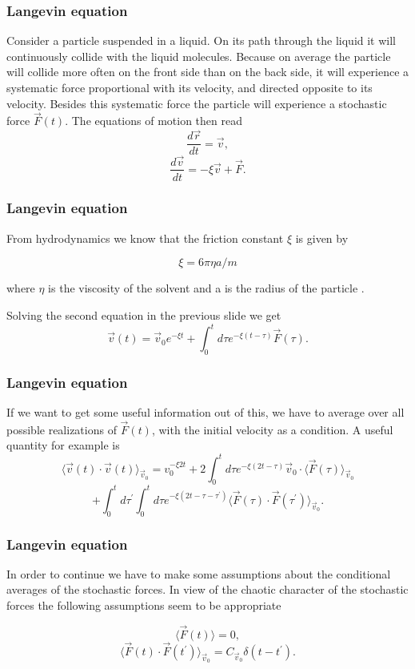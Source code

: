 \frame
{
  \frametitle{Langevin equation}
\begin{small}
{\scriptsize
Consider a particle  suspended in a liquid. On its path through the liquid it will continuously collide with the liquid molecules. Because on average the particle  will collide more often on the front side than on the back side, it will experience a systematic force proportional with its velocity, and directed opposite to its velocity. Besides this systematic force the particle  will experience a stochastic force  $ \vec{F}(t)$. 
The equations of motion then read 
\[ 
 \frac{d\vec{r}}{dt} 	=  \vec{v},
\] 	
\[
\frac{d\vec{v}}{dt} 	=  -\xi \vec{v}+\vec{F}.
\]


}
\end{small}
}
\frame
{
  \frametitle{Langevin equation}
\begin{small}
{\scriptsize
From hydrodynamics  we know that the friction constant  $\xi$ is given by

\begin{displaymath}\xi =6\pi \eta a/m \end{displaymath}

where $\eta$ is the viscosity  of the solvent and a is the radius of the particle .

Solving the second equation in the previous slide we get 
\[
\vec{v}(t)=\vec{v}_{0}e^{-\xi t}+\int_{0}^{t}d\tau e^{-\xi (t-\tau )}\vec{F }(\tau ). 
\]
}
\end{small}
}
\frame
{
  \frametitle{Langevin equation}
\begin{small}
{\scriptsize
If we want to get some useful information out of this, we have to average over all possible realizations of 
$ \vec{F}(t)$, with the initial velocity as a condition. A useful quantity for example is
 \[ 
\langle \vec{v}(t)\cdot \vec{v}(t)\rangle_{\vec{v}_{0}}=v_{0}^{-\xi 2t}
+2\int_{0}^{t}d\tau e^{-\xi (2t-\tau)}\vec{v}_{0}\cdot \langle \vec{F}(\tau )\rangle_{\vec{v}_{0}}
\]
\[  	  	
 +\int_{0}^{t}d\tau ^{\prime }\int_{0}^{t}d\tau e^{-\xi (2t-\tau -\tau ^{\prime })}
\langle \vec{F}(\tau )\cdot \vec{F}(\tau ^{\prime })\rangle_{ \vec{v}_{0}}.
\]
}
\end{small}
}
\frame
{
  \frametitle{Langevin equation}
\begin{small}
{\scriptsize
In order to continue we have to make some assumptions about the conditional averages of the stochastic forces. 
In view of the chaotic character of the stochastic forces the following assumptions seem to be appropriate
  
\[ \langle \vec{F}(t)\rangle 	= 	0, \]
\[\langle \vec{F}(t)\cdot \vec{F}(t^{\prime })\rangle_{\vec{v}_{0}}=  C_{\vec{v}_{0}}\delta (t-t^{\prime }).
\] 	

}
\end{small}
}
